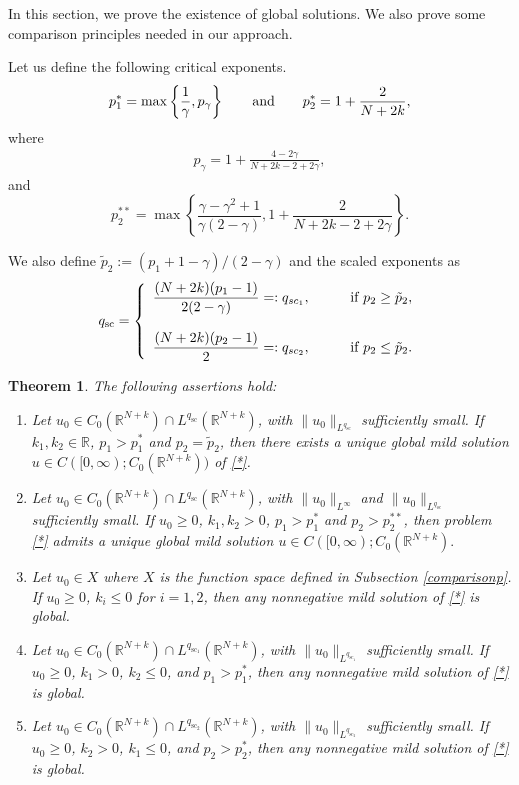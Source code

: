 \documentclass[a4,psfig,english,12pt,epsf,portrait]{article}
\newtheorem{theorem}{Theorem}[section]
\numberwithin{equation}{section}
\def\R{{\mathbb {R}}}
\def\R{\mathbb{R}}
\begin{document}
In this section, we prove the existence of global solutions. We also prove some comparison principles needed in our approach.

Let us define the following critical exponents.
\begin{equation}\label{critexp}
	p_1^* = \max\left\{\frac{1}{\gamma} , p_\gamma\right\} \qquad\hbox{and}\qquad	p_2^* = 1+ \frac{2}{N+2k} ,
\end{equation}
where
\begin{eqnarray*}
	p_\gamma =	1+ \frac{4-2\gamma}{N+2k-2+2\gamma} ,
\end{eqnarray*}
and
\begin{equation}
	p_2^{**}=\max\left\{\frac{\gamma-\gamma^2+1}{\gamma(2-\gamma)} , 1+\frac{2}{N+2k-2+2\gamma}\right\} .
\end{equation}


We also define $\tilde{p}_2:= (p_1+1-\gamma)/(2-\gamma)$ and the scaled exponents as
$$q_{\mathrm{sc}}=\left\{\begin{array}{ll}
	\displaystyle \frac{(N+2k)(p_1-1)}{2(2-\gamma)}  =: q_{sc_1},&\qquad\hbox{if}\,\, p_2\geq \tilde{p}_2,\\\\
	\displaystyle \frac{(N+2k)(p_2-1)}{2} =: q_{sc_2} ,&\qquad\hbox{if}\,\, p_2\leq \tilde{p}_2.\\
\end{array}
\right.$$
\begin{theorem}\label{global1}
	The following assertions hold:
	\begin{enumerate}
		\item[$(\mathrm{i})$] Let $u_0\in  C_0(\R^{N+k})\cap L^{q_{\mathrm{sc}}}(\R^{N+k})$, with $\|u_0\|_{L^{q_{\mathrm{sc}}}}$ sufficiently small.  If $k_1,k_2\in\mathbb{R}$, $p_1>p_1^*$ and $p_2=\tilde{p}_2$, then there exists a unique global mild solution $u\in C([0,\infty);C_0(\R^{N+k}))$ of \eqref{*}.
		\item[$(\mathrm{ii})$] Let $u_0\in  C_0(\R^{N+k})\cap L^{q_{\mathrm{sc}}}(\R^{N+k})$, with $\|u_0\|_{L^{\infty}}$ and  $\|u_0\|_{L^{q_{\mathrm{sc}}}}$ sufficiently small. If $u_0\geq0$,  $k_1,k_2>0$, $p_1>p_1^{*}$ and $p_2>p_2^{**}$, then problem \eqref{*} admits a unique global mild solution 
		$u\in C([0,\infty);C_0(\mathbb{R}^{N+k}).$
		\item[$(\mathrm{iii})$] Let $u_0\in X$ where $X$ is the function space defined in Subsection \ref{comparisonp}. If $u_0\geq0$, $k_i\leq0$ for $i=1,2$, then any nonnegative mild solution of \eqref{*} is global.
		\item[$(\mathrm{iv})$] Let $u_0\in  C_0(\R^{N+k})\cap L^{q_{\mathrm{sc_1}}}(\R^{N+k})$, with $\|u_0\|_{L^{q_{\mathrm{sc_1}}}}$ sufficiently small. If $u_0\geq0$, $k_1>0$, $k_2\leq0$, and $p_1>p_1^*$, then any nonnegative mild solution of \eqref{*} is global.
		\item[$(\mathrm{v})$]  Let $u_0\in  C_0(\R^{N+k})\cap L^{q_{\mathrm{sc_2}}}(\R^{N+k})$, with $\|u_0\|_{L^{q_{\mathrm{sc_2}}}}$ sufficiently small. If $u_0\geq0$, $k_2>0$, $k_1\leq 0$, and $p_2>p_2^*$, then any nonnegative mild solution of \eqref{*} is global.
	\end{enumerate}
\end{theorem}
\end{document}
